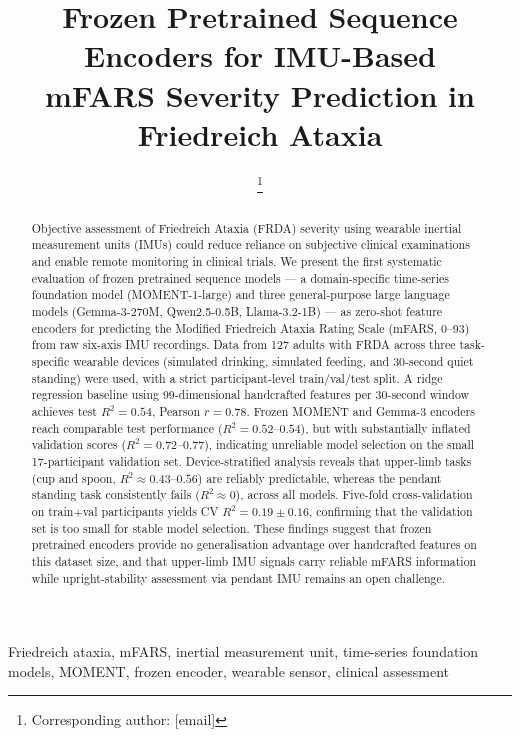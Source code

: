 \documentclass[10pt,twocolumn]{IEEEtran}
\title{Frozen Pretrained Sequence Encoders for IMU-Based\\
mFARS Severity Prediction in Friedreich Ataxia}
\author{
  \IEEEauthorblockN{Ben Nguyen\IEEEauthorrefmark{1},
                    [Co-author 2]\IEEEauthorrefmark{1},
                    [Co-author 3]\IEEEauthorrefmark{2}}
  \IEEEauthorblockA{\IEEEauthorrefmark{1}Stanford University,
                    Stanford, CA, USA}
  \IEEEauthorblockA{\IEEEauthorrefmark{2}[Affiliation 2]}
  \thanks{Corresponding author: [email]}
}
\begin{document}
\maketitle

\begin{abstract}
Objective assessment of Friedreich Ataxia (FRDA) severity using wearable
inertial measurement units (IMUs) could reduce reliance on subjective clinical
examinations and enable remote monitoring in clinical trials.
We present the first systematic evaluation of frozen pretrained sequence
models --- a domain-specific time-series foundation model (MOMENT-1-large)
and three general-purpose large language models (Gemma-3-270M, Qwen2.5-0.5B,
Llama-3.2-1B) --- as zero-shot feature encoders for predicting the
Modified Friedreich Ataxia Rating Scale (mFARS, 0--93) from raw
six-axis IMU recordings.
Data from 127 adults with FRDA across three task-specific wearable
devices (simulated drinking, simulated feeding, and 30-second quiet standing)
were used, with a strict participant-level train/val/test split.
A ridge regression baseline using 99-dimensional handcrafted features
per 30-second window achieves test $R^2 = 0.54$, Pearson $r = 0.78$.
Frozen MOMENT and Gemma-3 encoders reach comparable test performance
($R^2 = 0.52$--$0.54$), but with substantially inflated validation scores
($R^2 = 0.72$--$0.77$), indicating unreliable model selection on the
small 17-participant validation set.
Device-stratified analysis reveals that upper-limb tasks
(cup and spoon, $R^2 \approx 0.43$--$0.56$) are reliably
predictable, whereas the pendant standing task consistently fails
($R^2 \approx 0$), across all models.
Five-fold cross-validation on train$+$val participants yields
CV $R^2 = 0.19 \pm 0.16$, confirming that the validation set
is too small for stable model selection.
These findings suggest that frozen pretrained encoders provide
no generalisation advantage over handcrafted features on this
dataset size, and that upper-limb IMU signals carry reliable
mFARS information while upright-stability assessment via
pendant IMU remains an open challenge.
\end{abstract}

\begin{IEEEkeywords}
Friedreich ataxia, mFARS, inertial measurement unit, time-series foundation
models, MOMENT, frozen encoder, wearable sensor, clinical assessment
\end{IEEEkeywords}

\end{document}
